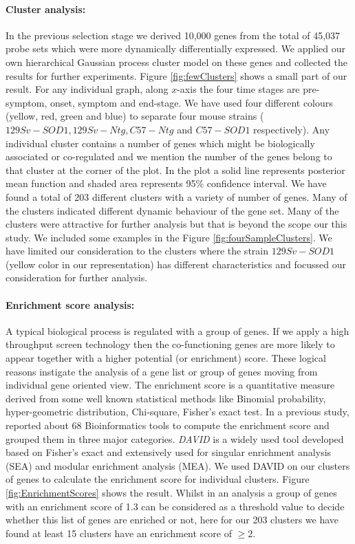 \paragraph{Cluster analysis:} 
In the previous selection stage we derived 10,000 genes from the total
of 45,037 probe sets which were more dynamically differentially
expressed. We applied our own hierarchical Gaussian process cluster
model on these genes and collected the results for further
experiments. Figure \ref{fig:fewClusters} shows a small part of our
result. For any individual graph, along $x$-axis the four time stages
are pre-symptom, onset, symptom and end-stage. We have used four
different colours (yellow, red, green and blue) to separate four mouse
strains ($129Sv-SOD1, 129Sv-Ntg, C57-Ntg$ and $C57-SOD1$
respectively). Any individual cluster contains a number of genes which
might be biologically associated or co-regulated and we mention the
number of the genes belong to that cluster at the corner of the
plot. In the plot a solid line represents posterior mean function and
shaded area represents 95\% confidence interval. We have found a total
of 203 different clusters with a variety of number of genes. Many of
the clusters indicated different dynamic behaviour of the gene
set. Many of the clusters were attractive for further analysis but
that is beyond the scope our this study. We included some examples in
the Figure \ref{fig:fourSampleClusters}. We have limited our
consideration to the clusters where the strain $129Sv-SOD1$ (yellow
color in our representation) has different characteristics and
focussed our consideration for further analysis.

\paragraph{Enrichment score analysis:}
A typical biological process is regulated with a group of genes. If we
apply a high throughput screen technology then the co-functioning
genes are more likely to appear together with a higher
potential (or enrichment) score. These logical reasons instigate the
analysis of a gene list or group of genes moving from individual gene
oriented view. The enrichment score is a quantitative measure derived
from some well known statistical methods like Binomial probability,
hyper-geometric distribution, Chi-square, Fisher's exact test. In a
previous study, \cite{Huang:2009Enrichment} reported about 68
Bioinformatics tools to compute the enrichment score and grouped them
in three major categories. \emph{DAVID} \cite{Huang:2009David} is a widely
used tool developed based on Fisher's exact and extensively used for
singular enrichment analysis (SEA) and modular enrichment
analysis (MEA). We used DAVID on our clusters of genes to calculate the
enrichment score for individual clusters.  Figure
\ref{fig:EnrichmentScores} shows the result. Whilst in an analysis a
group of genes with an enrichment score of 1.3 can be considered as a
threshold value to decide whether this list of genes are enriched or
not, here for our 203 clusters we have found at least 15 clusters have
an enrichment score of $\geq 2$.

